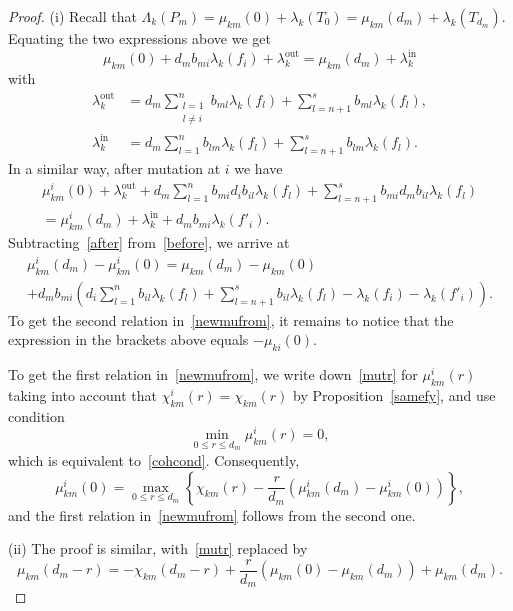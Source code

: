 \documentclass[10pt,a4paper]{amsart}
\begin{document}
\begin{proof}
(i) Recall that $\Lambda_k(P_m)=\mu_{km}(0)+\lambda_k(T_0)=\mu_{km}(d_m)+\lambda_k(T_{d_m})$. Equating the two expressions above we get
\begin{equation}\label{before}
\mu_{km}(0)%
+d_mb_{mi}\lambda_k(f_i)+\lambda_k^{\mathrm {out}}
=\mu_{km}(d_m)%
+\lambda_k^{\mathrm {in}}
\end{equation}
with
\begin{align*}
\lambda_k^{\mathrm {out}}&=d_m\sum_{\substack{l=1\\l\ne i}}^nb_{ml}\lambda_k(f_l)+\sum_{l=n+1}^sb_{ml}\lambda_k(f_l),\\
\lambda_k^{\mathrm {in}}&=d_m\sum_{l=1}^nb_{lm}\lambda_k(f_l)+\sum_{l=n+1}^sb_{lm}\lambda_k(f_l).
\end{align*}
In a similar way, after mutation at $i$ we have
\begin{multline}\label{after}
\mu_{km}^i(0)%
+\lambda_k^{\mathrm {out}}+d_m\sum_{l=1}^nb_{mi}d_ib_{il}\lambda_k(f_l)
+\sum_{l=n+1}^sb_{mi}d_mb_{il}\lambda_k(f_l)\\
=\mu_{km}^i(d_m)%
+\lambda_k^{\mathrm {in}}+d_mb_{mi}\lambda_k(f'_i).
\end{multline}
Subtracting~\eqref{after} from~\eqref{before}, 
we arrive at
\begin{multline*}
\mu_{km}^i(d_m)-\mu_{km}^i(0)=\mu_{km}(d_m)-\mu_{km}(0)\\
+d_mb_{mi}\left(d_i\sum_{l=1}^nb_{il}\lambda_k(f_l)
+\sum_{l=n+1}^sb_{il}\lambda_k(f_l)-\lambda_k(f_i)-\lambda_k(f'_i)\right).
\end{multline*}
To get the second relation in~\eqref{newmufrom}, it remains to notice that the expression in the brackets above equals
$-\mu_{ki}(0)$.

To get the first relation in~\eqref{newmufrom}, we write down~\eqref{mutr} for $\mu_{km}^i(r)$ 
taking into account that $\chi^i_{km}(r)=\chi_{km}(r)$ by Proposition~\ref{samefy},
and use condition
\[\min_{0\le r\le d_m}\mu_{km}^i(r)=0,\] 
which is equivalent to~\eqref{cohcond}. Consequently,
\[
\mu_{km}^i(0)=\max_{0\le r\le d_m}\left\{\chi_{km}(r)-\frac r{d_m}\left(\mu_{km}^i(d_m)-\mu_{km}^i(0)\right)\right\},
\]
and the first relation in~\eqref{newmufrom} follows from the second one.

(ii) The proof is similar, with~\eqref{mutr} replaced by
\[
\mu_{km}(d_m-r)=-\chi_{km}(d_m-r)+\frac r{d_m}(\mu_{km}(0)-\mu_{km}(d_m))+\mu_{km}(d_m).
\]
\end{proof}
\end{document}

